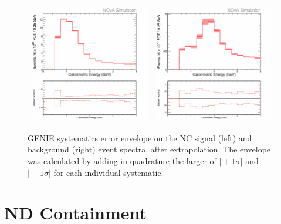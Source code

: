 \begin{figure}[htb]
  \centering
  \begin{tabular}{c c}
    \includegraphics[width=.47\textwidth]{figures/Systs/cNCEXGENIESysts.png} &
    \includegraphics[width=.47\textwidth]{figures/Systs/cBGEXGENIESysts.png} \\
  \end{tabular}
  \caption[GENIE Systematic Error Envelopes]{GENIE systematics error envelope on the NC signal (left) and background (right) event spectra, after extrapolation. The envelope was calculated by adding in quadrature the larger of $\vert +1\sigma \vert$ and $\vert -1\sigma \vert$ for each individual systematic.}
  \label{fig:SystGENIE}
\end{figure}

\section{ND Containment}

